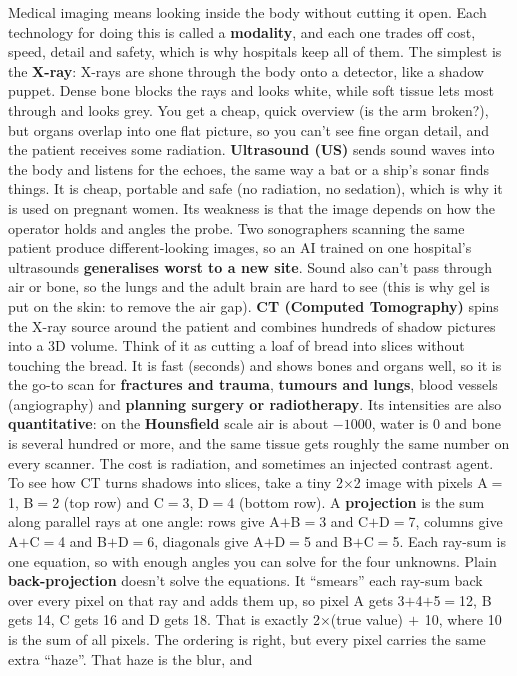 \documentclass[a4paper]{article}
\newcommand{\K}[1]{\textcolor{kg}{\textbf{#1}}}
\newcommand{\F}[1]{\textcolor{fb}{#1}}
\newcommand{\E}[1]{\textcolor{ep}{#1}}
\newcommand{\T}[1]{\textcolor{tr}{\textbf{#1}}}
\newcommand{\D}{\unskip\ \textbf{\textbullet}\ \ignorespaces}
\begin{document}
\twocolumn[{\StudyTitle{Study notes}
\noindent{\setlength{\fboxsep}{3pt}\fbox{\parbox{\dimexpr\linewidth-2\fboxsep-2\fboxrule}{\centering\footnotesize \textbf{Legend:}\ \K{green = key term} \D \F{blue = formula} \D \E{purple = example} \D \T{red = exam trap} \D \Nt{$x$} = notation \D {\itshape\color{black!70}grey italics = caption}}}}\par\vspace{6pt}}]

Medical imaging means looking inside the body without cutting it open. Each technology for doing this is called a \K{modality}, and each one trades off cost, speed, detail and safety, which is why hospitals keep all of them. The simplest is the \K{X-ray}: X-rays are shone through the body onto a detector, like a shadow puppet. Dense bone blocks the rays and looks white, while soft tissue lets most through and looks grey. You get a cheap, quick overview (\E{is the arm broken?}), but organs overlap into one flat picture, so you can't see fine organ detail, and the patient receives some radiation. \K{Ultrasound (US)} sends sound waves into the body and listens for the echoes, the same way a bat or a ship's sonar finds things. It is cheap, portable and safe (no radiation, no sedation), which is why it is used on pregnant women. Its weakness is that the image depends on how the operator holds and angles the probe. Two sonographers scanning the same patient produce different-looking images, so an AI trained on one hospital's ultrasounds \T{generalises worst to a new site}. Sound also can't pass through air or bone, so the lungs and the adult brain are hard to see (this is why gel is put on the skin: to remove the air gap). \K{CT (Computed Tomography)} spins the X-ray source around the patient and combines hundreds of shadow pictures into a 3D volume. Think of it as cutting a loaf of bread into slices without touching the bread. It is fast (seconds) and shows bones and organs well, so it is the go-to scan for \K{fractures and trauma}, \K{tumours and lungs}, blood vessels (angiography) and \K{planning surgery or radiotherapy}. Its intensities are also \K{quantitative}: on the \K{Hounsfield} scale \E{air is about $-1000$, water is 0 and bone is several hundred or more}, and the same tissue gets roughly the same number on every scanner. The cost is radiation, and sometimes an injected contrast agent. To see how CT turns shadows into slices, take a tiny 2$\times$2 image with pixels \E{A$=$1, B$=$2} (top row) and \E{C$=$3, D$=$4} (bottom row). A \K{projection} is the sum along parallel rays at one angle: rows give \E{A$+$B$=$3} and \E{C$+$D$=$7}, columns give \E{A$+$C$=$4} and \E{B$+$D$=$6}, diagonals give \E{A$+$D$=$5} and \E{B$+$C$=$5}. Each ray-sum is one equation, so with enough angles you can solve for the four unknowns. Plain \K{back-projection} doesn't solve the equations. It ``smears'' each ray-sum back over every pixel on that ray and adds them up, so pixel A gets \E{3$+$4$+$5$=$12}, B gets \E{14}, C gets \E{16} and D gets \E{18}. That is exactly \F{2$\times$(true value)$\,+\,$10}, where 10 is the sum of all pixels. The ordering is right, but every pixel carries the same extra ``haze''. That haze is the blur, and 
\end{document}

